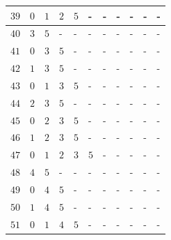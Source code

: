 \begin{appendices}
\begin{table}[H]
\begin{tabular} {|l|l|l|l|l|l|l|l|l|l|l|}
  		$ 39 $ & $ 0 $ &$ 1 $ &$ 2 $ &$ 5 $ & - &  - &  - &  - &  - &  -   \\ \hline
  		$ 40 $ & $ 3 $ &$ 5 $ & - &  - &  - &  - &  - &  - &  - &  -   \\ \hline
  		$ 41 $ & $ 0 $ &$ 3 $ &$ 5 $ & - &  - &  - &  - &  - &  - &  -   \\ \hline
  		$ 42 $ & $ 1 $ &$ 3 $ &$ 5 $ & - &  - &  - &  - &  - &  - &  -   \\ \hline
  		$ 43 $ & $ 0 $ &$ 1 $ &$ 3 $ &$ 5 $ & - &  - &  - &  - &  - &  -   \\ \hline
  		$ 44 $ & $ 2 $ &$ 3 $ &$ 5 $ & - &  - &  - &  - &  - &  - &  -   \\ \hline
  		$ 45 $ & $ 0 $ &$ 2 $ &$ 3 $ &$ 5 $ & - &  - &  - &  - &  - &  -   \\ \hline
  		$ 46 $ & $ 1 $ &$ 2 $ &$ 3 $ &$ 5 $ & - &  - &  - &  - &  - &  -   \\ \hline
  		$ 47 $ & $ 0 $ &$ 1 $ &$ 2 $ &$ 3 $ &$ 5 $ & - &  - &  - &  - &  -   \\ \hline
  		$ 48 $ & $ 4 $ &$ 5 $ & - &  - &  - &  - &  - &  - &  - &  -   \\ \hline
  		$ 49 $ & $ 0 $ &$ 4 $ &$ 5 $ & - &  - &  - &  - &  - &  - &  -   \\ \hline
  		$ 50 $ & $ 1 $ &$ 4 $ &$ 5 $ & - &  - &  - &  - &  - &  - &  -   \\ \hline
  		$ 51 $ & $ 0 $ &$ 1 $ &$ 4 $ &$ 5 $ & - &  - &  - &  - &  - &  -   \\ \hline
  		  		

\end{tabular}
\end{table}
\end{appendices}
